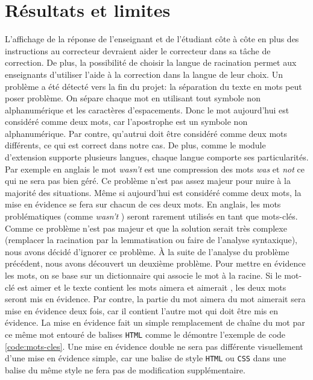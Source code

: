 ﻿\chapter{R\'esultats et limites}
L'affichage de la r\'eponse de l'enseignant et de l'\'etudiant c\^ote \`a c\^ote en plus des instructions au correcteur devraient aider le correcteur dans sa t\^ache de correction.
De plus, la possibilit\'e de choisir la langue de racination permet aux enseignants d'utiliser l'aide \`a la correction dans la langue de leur choix.
Un probl\`eme a \'et\'e d\'etect\'e vers la fin du projet: la s\'eparation du texte en mots peut poser probl\`eme.
On s\'epare chaque mot en utilisant tout symbole non alphanum\'erique et les caract\`eres d'espacements.
Donc le mot \og aujourd'hui \fg{} est consid\'er\'e comme deux mots, car l'apostrophe est un symbole non alphanum\'erique.
Par contre, \og qu'autrui \fg{} doit \^etre consid\'er\'e comme deux mots diff\'erents, ce qui est correct dans notre cas.
De plus, comme le module d'extension supporte plusieurs langues, chaque langue comporte ses particularit\'es.
Par exemple en anglais le mot \og \textit{wasn't} \fg{} est une compression des mots \og \textit{was} \fg{} et \og \textit{not} \fg{} ce qui ne sera pas bien g\'er\'e.
Ce probl\`eme n'est pas assez majeur pour nuire \`a la majorit\'e des situations.
M\^eme si \og aujourd'hui \fg{} est consid\'er\'e comme deux mots, la mise en \'evidence se fera sur chacun de ces deux mots.
En anglais, les mots probl\'ematiques (comme \og \textit{wasn't} \fg{}) seront rarement utilis\'es en tant que mots-cl\'es.
Comme ce probl\`eme n'est pas majeur et que la solution serait tr\`es complexe (remplacer la racination par la lemmatisation ou faire de l'analyse syntaxique), nous avons d\'ecidé d'ignorer ce probl\`eme.
\`A la suite de l'analyse du probl\`eme pr\'ec\'edent, nous avons d\'ecouvert un deuxi\`eme probl\`eme.
Pour mettre en \'evidence les mots, on se base sur un dictionnaire qui associe le mot \`a la racine.
Si le mot-cl\'e est \og aimer \fg{} et le texte contient les mots \og aimera \fg{} et \og aimerait \fg{}, les deux mots seront mis en \'evidence.
Par contre, la partie du mot \og aimera \fg{} du mot \og aimerait \fg{} sera mise en \'evidence deux fois, car il contient l'autre mot qui doit \^etre mis en \'evidence.
La mise en \'evidence fait un simple remplacement de cha\^ine du mot par ce m\^eme mot entour\'e de balises \texttt{HTML} comme le d\'emontre l'exemple de code \ref{code:mots-cles}.
Une mise en \'evidence double ne sera pas diff\'erente visuellement d'une mise en \'evidence simple, car une balise de style \texttt{HTML} ou \texttt{CSS} dans une balise du m\^eme style ne fera pas de modification suppl\'ementaire.
